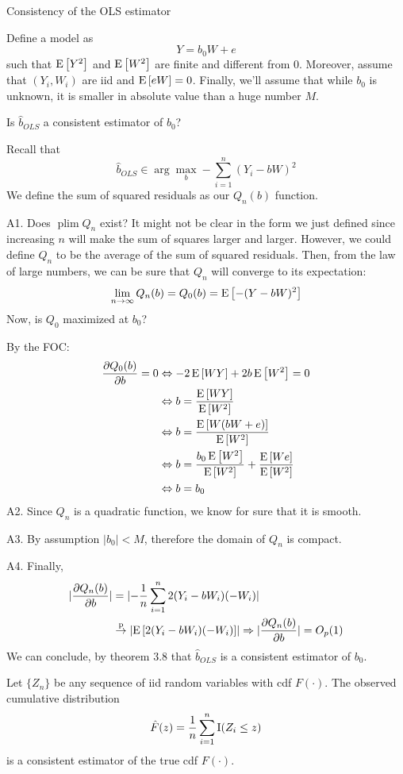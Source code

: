 \begin{bclogo}[couleur=blue!10, arrondi=0.1, logo=,ombre=false]{ Consistency of the OLS estimator} 
\begin{small}
Define a model as $$Y = b_0W + e$$ such that $\operatorname{E}\left[Y^2\right]$ and $\operatorname{E}\left[W^2\right]$ are finite and different from $0$. Moreover, assume that $(Y_i,W_i)$ are iid and $\operatorname{E}\left[eW\right]=0$. Finally, we'll assume that while $b_0$ is unknown, it is smaller in absolute value than a huge number $M$.

Is $\hat b_{OLS}$ a consistent estimator of $b_0$?

Recall that $$\hat b_{OLS} \in \operatorname{arg}\max_b -\sum_{i=1}^{n} (Y_i - bW)^2 $$ We define the sum of squared residuals as our $Q_n(b)$ function.

A1. Does $\operatorname{plim}Q_n$ exist? It might not be clear in the form we just defined since increasing $n$ will make the sum of squares larger and larger. However, we could define $Q_n$ to be the average of the sum of squared residuals. Then, from the law of large numbers, we can be sure that $Q_n$ will converge to its expectation: $$\lim_{n\to\infty} Q_n(b) = Q_0(b) = \operatorname{E}\left[-(Y - bW)^2\right]$$ Now, is $Q_0$ maximized at $b_0$?

By the FOC: \begin{align*}
\frac{\partial Q_0(b)}{\partial b} = 0 & \Leftrightarrow -2\operatorname{E}\left[WY\right] + 2b\operatorname{E}\left[W^2\right] = 0 \\
& \Leftrightarrow  b = \frac{\operatorname{E}\left[WY\right]}{\operatorname{E}\left[W^2\right]} \\
& \Leftrightarrow  b = \frac{\operatorname{E}\left[W(bW+e)\right]}{\operatorname{E}\left[W^2\right]} \\
& \Leftrightarrow  b = \frac{b_0\operatorname{E}\left[W^2\right]}{\operatorname{E}\left[W^2\right]} + \frac{\operatorname{E}\left[We\right]}{\operatorname{E}\left[W^2\right]} \\
& \Leftrightarrow  b = b_0\\
\end{align*}
A2. Since $Q_n$ is a quadratic function, we know for sure that it is smooth.

A3. By assumption $\lvert b_0\rvert < M$, therefore the domain of $Q_n$ is compact.

A4. Finally, \begin{align*}
\lvert \frac{\partial Q_n(b)}{\partial b} \rvert & = \lvert -\frac{1}{n} \sum_{i=1}^{n} 2(Y_i - bW_i)(-W_i)\rvert \\
& \overset{\text{p}}{\to} \lvert\operatorname{E}\left[2(Y_i - bW_i)(-W_i)\right]\rvert \Rightarrow \lvert \frac{\partial Q_n(b)}{\partial b} \rvert = O_p(1)
\end{align*}
We can conclude, by theorem 3.8 that $\hat b_{OLS}$ is a consistent estimator of $b_0$.
\end{small}
\end{bclogo}

\begin{theorem}
Let $\{ Z_n\}$ be any sequence of iid random variables with cdf $F(\cdot)$. The observed cumulative distribution $$\hat F(z) = \frac{1}{n} \sum_{i=1}^{n}\operatorname{I}(Z_i \leq z)$$ is a consistent estimator of the true cdf $F(\cdot)$.
\end{theorem}